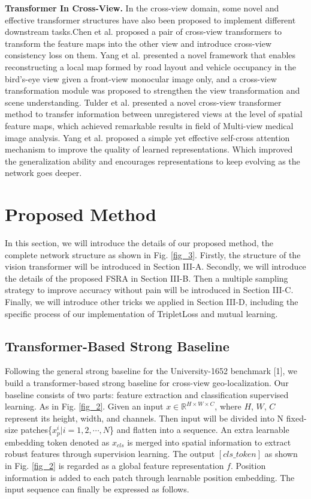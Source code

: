 \documentclass[lettersize,journal]{IEEEtran}
\begin{document}
\textbf{Transformer In Cross-View.} In the cross-view domain, some novel and effective transformer structures have also been proposed to implement different downstream tasks.Chen et al. \cite{ref50} proposed a pair of cross-view transformers to transform the feature maps into the other view and introduce cross-view consistency loss on them. Yang et al. \cite{ref57} presented a novel framework that enables reconstructing a local map formed by road layout and vehicle occupancy in the bird’s-eye view given a front-view monocular image only, and a cross-view transformation module was proposed to strengthen the view transformation and scene understanding. Tulder et al. \cite{ref58}  presented a novel cross-view transformer method to transfer information between unregistered views at the level of spatial feature maps, which achieved remarkable results in field of Multi-view medical image analysis. Yang et al. \cite{ref60} proposed a simple yet effective self-cross attention mechanism to improve the quality of learned representations. Which improved the generalization ability and encourages representations to keep evolving as the network goes deeper.

\section{Proposed Method}
In this section, we will introduce the details of our proposed method, the complete network structure as shown in Fig. \ref{fig_3}. Firstly, the structure of the vision transformer will be introduced in Section III-A. Secondly, we will introduce the details of the proposed FSRA in Section III-B. Then a multiple sampling strategy to improve accuracy without pain will be introduced in Section III-C. Finally, we will introduce other tricks we applied in Section III-D, including the specific process of our implementation of TripletLoss and mutual learning.

\subsection{Transformer-Based Strong Baseline}
Following the general strong baseline for the University-1652 benchmark [1], we build a transformer-based strong baseline for cross-view geo-localization. Our baseline consists of two parts: feature extraction and classification supervised learning. As in Fig. \ref{fig_2}. Given an input $x\in{\mathbb{R}^{H\times{W\times{C}}}}$, where $H$, $W$, $C$ represent its height, width, and channels. Then input will be divided into N fixed-size patches\{$x_p^i|i=1,2,\cdots,N$\} and flatten into a sequence. An extra learnable embedding token denoted as $x_{cls}$ is merged into spatial information to extract robust features through supervision learning. The output $[cls\_token]$ as shown in Fig. \ref{fig_2} is regarded as a global feature representation $f$. Position information is added to each patch through learnable position embedding. The input sequence can finally be expressed as follows. 
\end{document}
